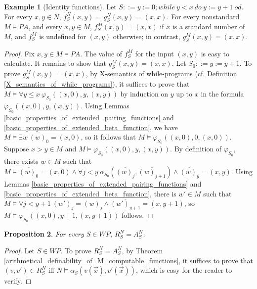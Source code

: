\documentclass[a4paper,11pt]{article}
\begin{document}
\theoremstyle{definition}
\newtheorem{example_for_two_semantics}{Example}[subsection]
\begin{example_for_two_semantics}[Identity functions]\label{example_for_two_semantics}
  Let $S ::= y:=0; while\ y<x\ do\ y:=y+1\ od$. For every $x,y\in N$, $f_S^N(x,y)$ = $g_S^N(x,y)$ = $(x,x)$. For every nonstandard $M\models PA$, and every $x,y\in M$, $f_S^M(x,y) = (x,x)$ if $x$ is a standard number of $M$, and $f_S^M$ is undefined for $(x,y)$ otherwise; in contrast, $g_S^M(x,y) = (x,x)$.
\end{example_for_two_semantics}
\begin{proof}
  Fix $x,y \in M\models PA$. The value of $f_S^M$ for the input $(x,y)$ is easy to calculate. It remains to show that $g_S^M(x,y) = (x,x)$. Let $S_0 ::= y:=y+1$. To prove $g_S^M(x,y) = (x,x)$, by X-semantics of while-programs (cf. Definition \ref{X_semantics_of_while_programs}), it suffices to prove that $M\models \forall y\leq x\ \varphi_{S_0}((x, 0), y, (x, y))$ by induction on $y$ up to $x$ in the formula $\varphi_{S_0}((x, 0), y, (x, y))$. Using Lemmas \ref{basic_properties_of_extended_pairing_functions} and \ref{basic_properties_of_extended_beta_function}, we have $M\models \exists w\ \overline{(w)_0} = ( x,0 )$, so it follows that $M\models \varphi_{S_0}((x, 0), 0, (x, 0))$. Suppose $x > y\in M$ and $M\models \varphi_{S_0}((x, 0), y, (x, y))$. By definition of $\varphi_{S_0}$, there exists $w\in M$ such that $M\models \overline{(w)_0} = (x, 0) \wedge \forall j<y\ \alpha_{S_0}(\overline{(w)_j},\overline{(w)_{j+1}}) \wedge \overline{(w)_y} = ( x,y )$. Using Lemmas \ref{basic_properties_of_extended_pairing_functions} and \ref{basic_properties_of_extended_beta_function}, there is $w'\in M$ such that $M\models  \forall j<y+1\ (w')_j = (w)_j \wedge \overline{(w')_{y+1}} = ( x, y+1 )$, so $M\models \varphi_{S_0}((x, 0), y+1, (x, y+1))$ follows.
\end{proof}

\theoremstyle{plain}
\newtheorem{comparison_of_two_semantics_over_N}[example_for_two_semantics]{Proposition}
\begin{comparison_of_two_semantics_over_N}\label{comparison_of_two_semantics_over_N}
For every $S\in WP$, $R_S^N = A_S^N$.
\end{comparison_of_two_semantics_over_N}
\begin{proof}
Let $S\in WP$. To prove $R_S^N = A_S^N$, by Theorem \ref{arithmetical_definability_of_M_computable_functions}, it suffices to prove that $(v,v')\in R_S^N$ iff $N \models \alpha_S(v(\vec{x}), v'(\vec{x}))$, which is easy for the reader to verify.
\end{proof}
\end{document}
